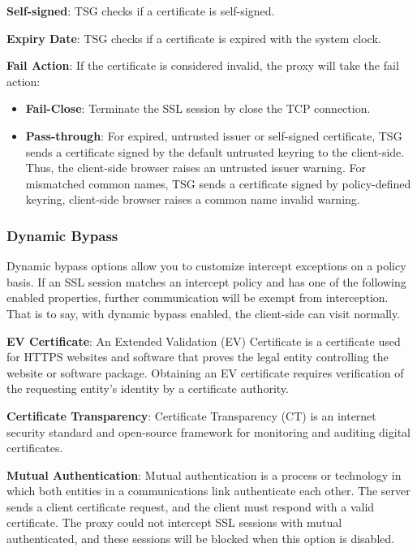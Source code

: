 \textbf{Self-signed}: TSG checks if a certificate is self-signed.


\textbf{Expiry Date}: TSG checks if a certificate is expired with the system clock.


\textbf{Fail Action}: If the certificate is considered invalid, the proxy will take the fail action:

\begin{itemize}
    \item \textbf{Fail-Close}: Terminate the SSL session by close the TCP connection.
    \item \textbf{Pass-through}: For expired, untrusted issuer or self-signed certificate, TSG sends a certificate signed by 
    the default untrusted keyring to the client-side. Thus, the client-side browser raises an untrusted issuer warning. 
    For mismatched common names, TSG sends a certificate signed by policy-defined keyring, client-side browser raises a common name invalid warning.
\end{itemize}

\subsubsection*{\hypertarget{link:Dynamic Bypass}{Dynamic Bypass}}
\label{sec:decrypt:profile:decryptionprofile:bypass}

Dynamic bypass options allow you to customize intercept exceptions on a policy basis. 
If an SSL session matches an intercept policy and has one of the following enabled properties, further communication will be exempt from interception. 
That is to say, with dynamic bypass enabled, the client-side can visit normally.


\textbf{EV Certificate}: An Extended Validation (EV) Certificate is a certificate used for HTTPS websites and software that proves the legal entity controlling the website or software package. Obtaining an EV certificate requires verification of the requesting entity's identity by a certificate authority.


\textbf{Certificate Transparency}: Certificate Transparency (CT) is an internet security standard and open-source framework for monitoring and auditing digital certificates.


\textbf{Mutual Authentication}: Mutual authentication is a process or technology in which both entities in a communications link authenticate each other. 
The server sends a client certificate request, and the client must respond with a valid certificate. 
The proxy could not intercept SSL sessions with mutual authenticated, and these sessions will be blocked when this option is disabled.


